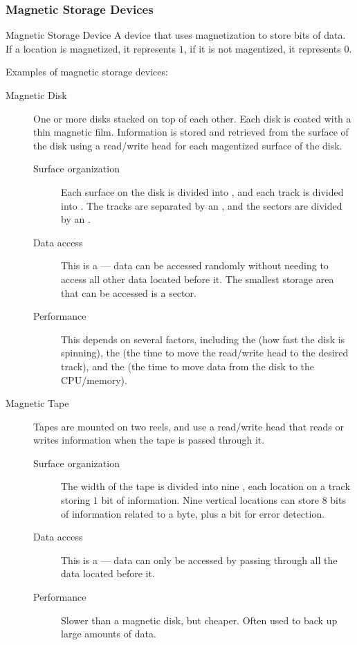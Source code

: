 \documentclass[../notes.tex]{subfiles}
\begin{document}
				\subsubsection{Magnetic Storage Devices}
					\begin{definition}{Magnetic Storage Device}
						A device that uses magnetization to store bits of data. If a location is magnetized, it represents $1$, if it is not magentized, it represents $0$.
					\end{definition}
					Examples of magnetic storage devices:
					\begin{indentparagraph}
						\begin{description}
							\item[Magnetic Disk] One or more disks stacked on top of each other. Each disk is coated with a thin magnetic film. Information is stored and retrieved from the surface of the disk using a read/write head for each magentized surface of the disk.
								\begin{description}
									\item[Surface organization] Each surface on the disk is divided into , and each track is divided into . The tracks are separated by an , and the sectors are divided by an .
									\item[Data access] This is a  --- data can be accessed randomly without needing to access all other data located before it. The smallest storage area that can be accessed is a sector.
									\item[Performance] This depends on several factors, including the  (how fast the disk is spinning), the  (the time to move the read/write head to the desired track), and the  (the time to move data from the disk to the CPU/memory).
								\end{description}
							\item[Magnetic Tape] Tapes are mounted on two reels, and use a read/write head that reads or writes information when the tape is passed through it.
								\begin{description}
									\item[Surface organization] The width of the tape is divided into nine , each location on a track storing $1$ bit of information. Nine vertical locations can store $8$ bits of information related to a byte, plus a bit for error detection.
									\item[Data access] This is a  --- data can only be accessed by passing through all the data located before it.
									\item[Performance] Slower than a magnetic disk, but cheaper. Often used to back up large amounts of data.  
								\end{description}
						\end{description}
					\end{indentparagraph}
\end{document}
